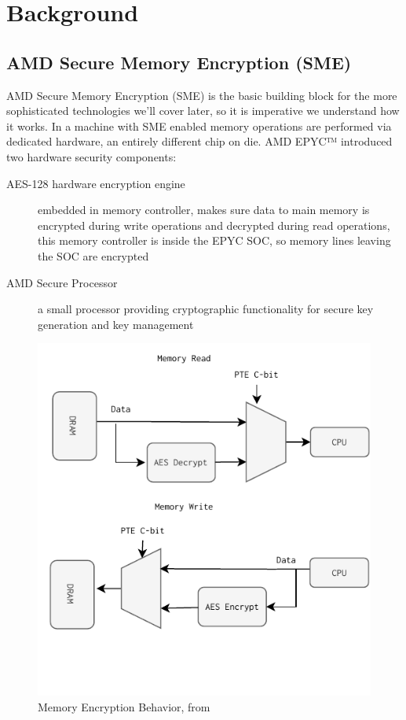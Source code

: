 \documentclass[twocolumn]{article}
\begin{document}
\section{Background}


\subsection{AMD Secure Memory Encryption (SME)}
    AMD Secure Memory Encryption (SME) is the basic building block for the more sophisticated technologies we'll cover later, so it is imperative we understand how it works. In a machine with SME enabled memory operations are performed via dedicated hardware, an entirely different chip on die. AMD EPYC™ introduced two hardware security components:
    \begin{description}
        \item [AES-128 hardware encryption engine] embedded in memory controller, makes sure data to main memory is encrypted during write operations and decrypted during read operations, this memory controller is inside the EPYC SOC, so memory lines leaving the SOC are encrypted
        \item [AMD Secure Processor] a small processor providing cryptographic functionality for secure key generation and key management
    \end{description}

    \begin{figure}
        \centering
        \includegraphics[scale=0.9]{img/read-write.pdf}
        \caption{Memory Encryption Behavior, from \cite{memory-encryption}}
    \end{figure}
\end{document}

